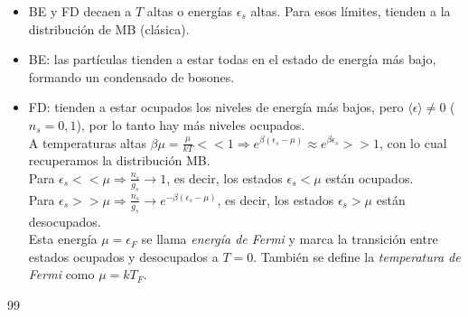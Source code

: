\documentclass[a4paper]{article}
\begin{document}
\begin{itemize}
\item BE y FD decaen a $T$ altas o energ\'ias $\epsilon_{s}$ altas. Para esos l\'imites, tienden a la distribuci\'on de MB (cl\'asica).\\
\item BE: las part\'iculas tienden a estar todas en el estado de energ\'ia m\'as bajo, formando un condensado de bosones.\\

\item FD: tienden a estar ocupados los niveles de energ\'ia m\'as bajos, pero $\langle \epsilon \rangle \neq 0$ ($n_{s} = 0,1$), por lo tanto hay m\'as niveles ocupados.\\

A temperaturas altas $\beta \mu = \frac{\mu}{kT} << 1 \Rightarrow e^{\beta(\epsilon_{s} - \mu)} \approx e^{\beta \epsilon_{s}} >> 1$, con lo cual recuperamos la distribuci\'on MB.\\

Para $\epsilon_{s} << \mu \Rightarrow \frac{n_{s}}{g_{s}} \rightarrow 1$, es decir, los estados $\epsilon_{s} < \mu$ est\'an ocupados.\\

Para $\epsilon_{s} >> \mu \Rightarrow \frac{n_{s}}{g_{s}} \rightarrow e^{-\beta(\epsilon_{s} - \mu)}$, es decir, los estados $\epsilon_{s} > \mu$ est\'an desocupados.\\

Esta energ\'ia $\mu = \epsilon_{F}$ se llama \textit{energ\'ia de Fermi} y marca la transici\'on entre estados ocupados y desocupados a $T = 0$. Tambi\'en se define la \textit{temperatura de Fermi} como $\mu = kT_{F}$.

\end{itemize}



\newpage
\begin{thebibliography}{99} %
 
\end{thebibliography}


\end{document}
